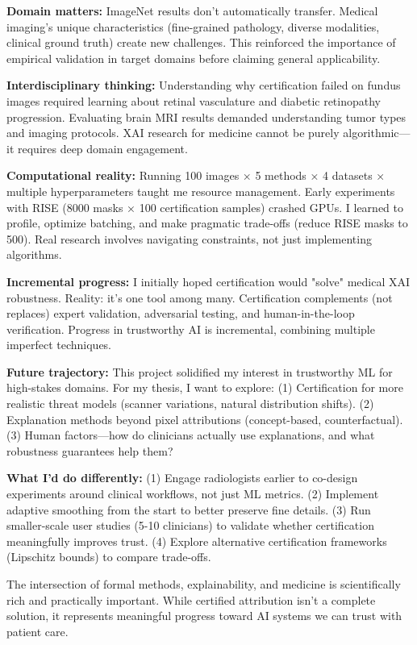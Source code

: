 \documentclass[11pt]{article}
\begin{document}
\textbf{Domain matters:} ImageNet results don't automatically transfer. Medical imaging's unique characteristics (fine-grained pathology, diverse modalities, clinical ground truth) create new challenges. This reinforced the importance of empirical validation in target domains before claiming general applicability.

\textbf{Interdisciplinary thinking:} Understanding why certification failed on fundus images required learning about retinal vasculature and diabetic retinopathy progression. Evaluating brain MRI results demanded understanding tumor types and imaging protocols. XAI research for medicine cannot be purely algorithmic—it requires deep domain engagement.

\textbf{Computational reality:} Running 100 images × 5 methods × 4 datasets × multiple hyperparameters taught me resource management. Early experiments with RISE (8000 masks × 100 certification samples) crashed GPUs. I learned to profile, optimize batching, and make pragmatic trade-offs (reduce RISE masks to 500). Real research involves navigating constraints, not just implementing algorithms.

\textbf{Incremental progress:} I initially hoped certification would "solve" medical XAI robustness. Reality: it's one tool among many. Certification complements (not replaces) expert validation, adversarial testing, and human-in-the-loop verification. Progress in trustworthy AI is incremental, combining multiple imperfect techniques.

\textbf{Future trajectory:} This project solidified my interest in trustworthy ML for high-stakes domains. For my thesis, I want to explore: (1) Certification for more realistic threat models (scanner variations, natural distribution shifts). (2) Explanation methods beyond pixel attributions (concept-based, counterfactual). (3) Human factors—how do clinicians actually use explanations, and what robustness guarantees help them?

\textbf{What I'd do differently:} (1) Engage radiologists earlier to co-design experiments around clinical workflows, not just ML metrics. (2) Implement adaptive smoothing from the start to better preserve fine details. (3) Run smaller-scale user studies (5-10 clinicians) to validate whether certification meaningfully improves trust. (4) Explore alternative certification frameworks (Lipschitz bounds) to compare trade-offs.

The intersection of formal methods, explainability, and medicine is scientifically rich and practically important. While certified attribution isn't a complete solution, it represents meaningful progress toward AI systems we can trust with patient care.
\end{document}

